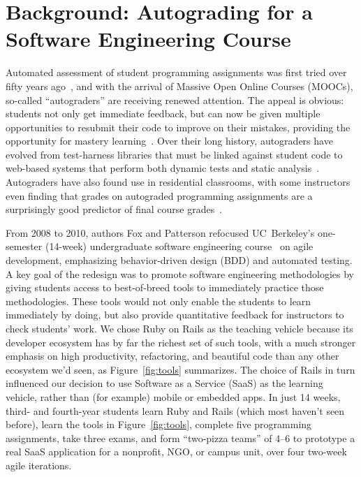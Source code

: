 \section{Background: Autograding for a Software Engineering Course}

Automated assessment of student programming assignments was first tried
over fifty years ago~\cite{hollingsworth60}, and with the arrival of
Massive Open Online Courses (MOOCs), so-called ``autograders'' are
receiving renewed attention.  The appeal is obvious: students not only
get immediate feedback, but can now be given multiple opportunities to
resubmit their code to improve on their mistakes, providing the
opportunity for mastery learning~\cite{bloom1971mastery}.  Over their long history, autograders
have evolved from test-harness libraries that must be linked against
student code to web-based systems that perform both dynamic tests and static
analysis~\cite{douce-2005-autograding-survey}.  Autograders have also
found use in residential classrooms, with some instructors even finding
that grades on autograded programming assignments are a surprisingly good
predictor of final course grades~\cite{navrat2014}.

From 2008 to 2010, authors Fox and Patterson refocused
UC~Berkeley's one-semester (14-week) undergraduate software engineering
course~\cite{crossing_the_software_chasm,agile_sw_curriculum} on agile
development, emphasizing
behavior-driven design (BDD)
and automated testing.  A key goal
of the redesign
was to promote software engineering methodologies
by giving students access to best-of-breed tools to immediately
practice those methodologies.  These tools would not only enable the
students to learn immediately by doing, but also provide quantitative
feedback for instructors to check students' work.  
We chose Ruby on Rails as the teaching vehicle because its developer
ecosystem has by far the richest set of such tools, with a much stronger
emphasis on high productivity, refactoring, and beautiful code than any
other ecosystem we'd seen, as Figure~\ref{fig:tools} summarizes.
The choice of Rails in turn influenced our decision to use Software as a
Service (SaaS) as the learning vehicle, rather than (for example) mobile
or embedded apps.
In just 14 weeks, third- and fourth-year students learn Ruby
and Rails (which most haven't seen before), learn the tools in Figure~\ref{fig:tools}, complete
five programming assignments, take three exams, and form ``two-pizza
teams'' of 4--6 to prototype a real SaaS application for a nonprofit,
NGO, or campus unit, over four two-week agile iterations.

